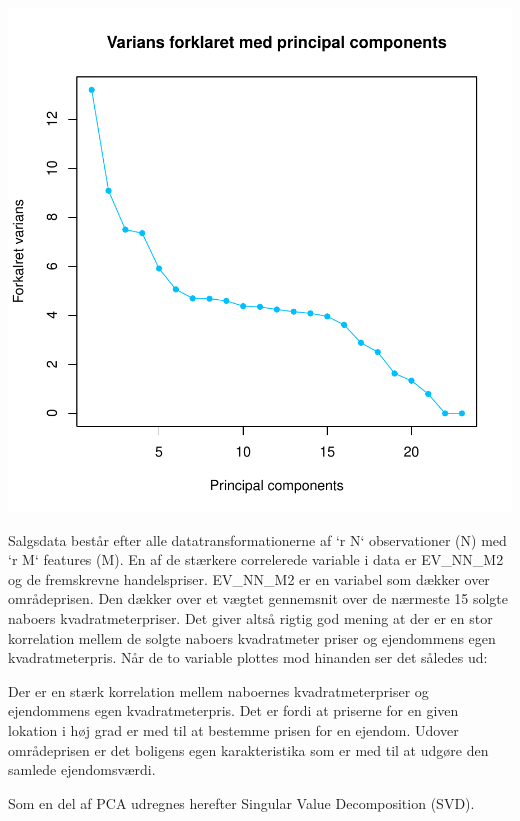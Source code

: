 \documentclass{report}
\begin{document}
\includegraphics{rapport_latex-008}


Salgsdata består efter alle datatransformationerne af `r N` observationer (N) med `r M` features (M).
En af de stærkere correlerede variable i data er EV\_NN\_M2 og de fremskrevne handelspriser. EV\_NN\_M2 er en variabel som dækker over områdeprisen. Den dækker over et vægtet gennemsnit over de nærmeste 15 solgte naboers kvadratmeterpriser. Det giver altså rigtig god mening at der er en stor korrelation mellem de solgte naboers kvadratmeter priser og ejendommens egen kvadratmeterpris.
Når de to variable plottes mod hinanden ser det således ud:

Der er en stærk korrelation mellem naboernes kvadratmeterpriser og ejendommens egen kvadratmeterpris. Det er fordi at priserne for en given lokation i høj grad er med til at bestemme prisen for en ejendom.
Udover områdeprisen er det boligens egen karakteristika som er med til at udgøre den samlede ejendomsværdi.

Som en del af PCA udregnes herefter Singular Value Decomposition (SVD).
\end{document}
